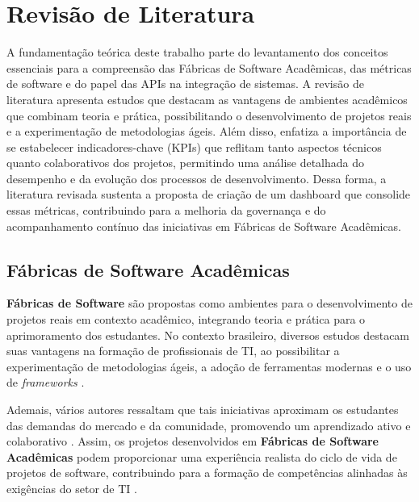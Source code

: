 \documentclass[
	12pt,           %
	openright,      %
	oneside,        %
	a4paper,        %
	brazil          %
]{abntex2}
\begin{document}
\section{Revisão de Literatura}

 A fundamentação teórica deste trabalho parte do levantamento dos conceitos essenciais para a compreensão das Fábricas de Software Acadêmicas, das métricas de software e do papel das APIs na integração de sistemas. A revisão de literatura apresenta estudos que destacam as vantagens de ambientes acadêmicos que combinam teoria e prática, possibilitando o desenvolvimento de projetos reais e a experimentação de metodologias ágeis. Além disso, enfatiza a importância de se estabelecer indicadores-chave (KPIs) que reflitam tanto aspectos técnicos quanto colaborativos dos projetos, permitindo uma análise detalhada do desempenho e da evolução dos processos de desenvolvimento. Dessa forma, a literatura revisada sustenta a proposta de criação de um dashboard que consolide essas métricas, contribuindo para a melhoria da governança e do acompanhamento contínuo das iniciativas em Fábricas de Software Acadêmicas. 

\subsection{Fábricas de Software Acadêmicas}
\textbf{Fábricas de Software} são propostas como ambientes para o desenvolvimento de projetos reais em contexto acadêmico, integrando teoria e prática para o aprimoramento dos estudantes. No contexto brasileiro, diversos estudos destacam suas vantagens na formação de profissionais de TI, ao possibilitar a experimentação de metodologias ágeis, a adoção de ferramentas modernas e o uso de \emph{frameworks} \cite{oliveira2017conduccao, fernandes2004fabrica, romanha2015fabrica, almeida2006liccoes}.

Ademais, vários autores ressaltam que tais iniciativas aproximam os estudantes das demandas do mercado e da comunidade, promovendo um aprendizado ativo e colaborativo \cite{dos2021experiencia, neto2017relato}. Assim, os projetos desenvolvidos em \textbf{Fábricas de Software Acadêmicas} podem proporcionar uma experiência realista do ciclo de vida de projetos de software, contribuindo para a formação de competências alinhadas às exigências do setor de TI \cite{romanha2016modelo}.
\end{document}
